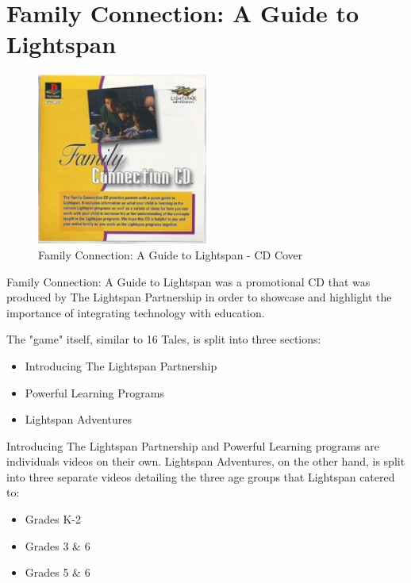 \chapter{Family Connection: A Guide to Lightspan}

\begin{figure}[H]
    \centering
    \includegraphics[width=0.5\textwidth]{"./Games/FamilyConnection/Images/FamilyConnectionAGuidetoLightspanCDCover.jpg"}
    \caption{Family Connection: A Guide to Lightspan - CD Cover}
\end{figure}

Family Connection: A Guide to Lightspan was a promotional CD that was produced by The Lightspan Partnership in order to showcase and highlight the importance of integrating technology with education.

The "game" itself, similar to 16 Tales, is split into three sections:

\begin{itemize}
    \item Introducing The Lightspan Partnership
    \item Powerful Learning Programs
    \item Lightspan Adventures
\end{itemize}

Introducing The Lightspan Partnership and Powerful Learning programs are individuals videos on their own.
Lightspan Adventures, on the other hand, is split into three separate videos detailing  the three age groups that Lightspan catered to:

\begin{itemize}
    \item Grades K-2
    \item Grades 3 \& 6
    \item Grades 5 \& 6
\end{itemize}

